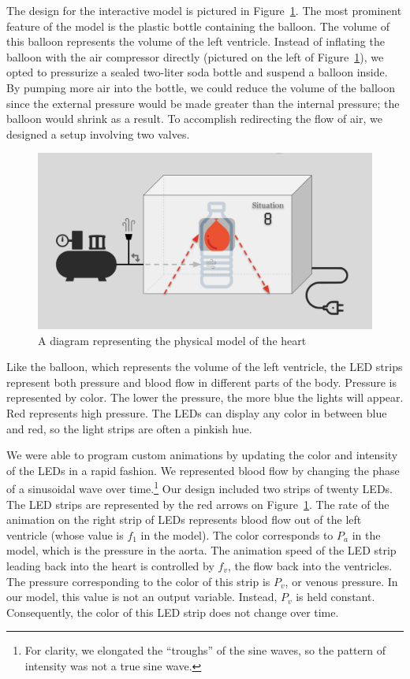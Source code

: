 \documentclass[a4paper, 10pt, american, titlepage]{article}
\begin{document}
The design for the interactive model is pictured in
Figure~\ref{fig:interactiveModel}. The most prominent feature of the model is
the plastic bottle containing the balloon. The volume of this balloon represents
the volume of the left ventricle. Instead of inflating the balloon with the air
compressor directly (pictured on the left of Figure~\ref{fig:interactiveModel}),
we opted to pressurize a sealed two-liter soda bottle and suspend a balloon
inside. By pumping more air into the bottle, we could reduce the volume of the
balloon since the external pressure would be made greater than the internal
pressure; the balloon would shrink as a result. To accomplish redirecting the
flow of air, we designed a setup involving two valves.

\begin{figure}[h] \centering
    \includegraphics[width=\textwidth]{interactive-model.png}
    \caption{A diagram representing the physical model of the heart}
    \label{fig:interactiveModel}
\end{figure}

Like the balloon, which represents the volume of the left ventricle, the LED
strips represent both pressure and blood flow in different parts of the body.
Pressure is represented by color. The lower the pressure, the more blue the
lights will appear. Red represents high pressure. The LEDs can display any color
in between blue and red, so the light strips are often a pinkish hue.

We were able to program custom animations by updating the color and intensity of
the LEDs in a rapid fashion. We represented blood flow by changing the phase of
a sinusoidal wave over time.\footnote{For clarity, we elongated the ``troughs''
of the sine waves, so the pattern of intensity was not a true sine wave.} Our
design included two strips of twenty LEDs. The LED strips are represented by the
red arrows on Figure~\ref{fig:interactiveModel}. The rate of the animation on
the right strip of LEDs represents blood flow out of the left ventricle (whose
value is $f_{1}$ in the model). The color corresponds to $P_{a}$ in the model,
which is the pressure in the aorta. The animation speed of the LED strip leading
back into the heart is controlled by $f_{v}$, the flow back into the ventricles.
The pressure corresponding to the color of this strip is $P_{v}$, or venous
pressure. In our model, this value is not an output variable. Instead, $P_{v}$
is held constant. Consequently, the color of this LED strip does not change over
time.
\end{document}
